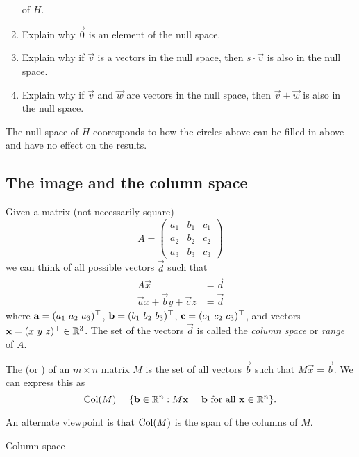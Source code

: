 \documentclass{ximera}
\begin{document}
\begin{example}
\begin{enumerate}
          of
          $H$.
    \item Explain why $\vec{0}$ is an element of the null space.
    \item Explain why if $\vec{v}$ is a vectors in the null space, then $s\cdot
            \vec{v}$ is also in the null space.
    \item Explain why if $\vec{v}$ and $\vec{w}$ are vectors in the null space,
          then $\vec{v} + \vec{w}$ is also in the null space.
  \end{enumerate}
  \begin{explanation}
    The null space of $H$ cooresponds to how the circles above can be filled in
    above and have no effect on the results.
  \end{explanation}
\end{example}

\subsection{The image and the column space}

Given a matrix (not necessarily square)
\[
  A = \begin{pmatrix}
    a_1 & b_1 & c_1 \\
    a_2 & b_2 & c_2 \\
    a_3 & b_3 & c_3
  \end{pmatrix}
\]
we can think of all possible vectors $\vec{d}$ such that
\begin{align*}
  A\vec{x}                          & = \vec{d} \\
  \vec{a} x + \vec{b} y + \vec{c} z & = \vec{d}
\end{align*}
where $\mathbf{a} = (a_1~a_2~a_3)^\top$, $\mathbf{b} =
  (b_1~b_2~b_3)^\top$, $\mathbf{c} = (c_1~c_2~c_3)^\top$, and vectors
$\mathbf{x} = (x~y~z)^\top\in\mathbb{R}^3$.
The set of the vectors $\vec{d}$ is called the \textit{column space} or
\textit{range} of $A$.

\begin{definition}
  The  (or ) of an $m \times n$ matrix $M$ is
  the set of all vectors $\vec{b}$ such that $M\vec{x} = \vec{b}$. We can
  express
  this as
  \[
    \operatorname{Col}(M) = \{ \mathbf{b}\in\mathbb{R}^n: M\mathbf{x} = \mathbf{b}\text{~for
      all~}\mathbf{x}\in\mathbb{R}^n\}.
  \]
\end{definition}

An alternate viewpoint is that $\operatorname{Col}(M)$ is the span of the columns of
$M$.

\begin{example}
  Column space
\end{example}
\end{document}
